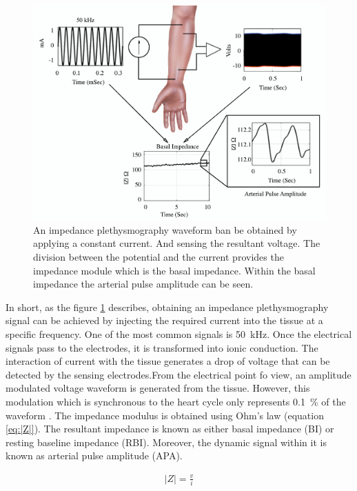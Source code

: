 \begin{figure}[!htpb]
	\centering
	\includegraphics[width=\textwidth,keepaspectratio]{figure15}    
	\caption[How to get an impedance plethysmography wavefor]{An impedance plethysmography waveform ban be obtained by applying a constant current. And sensing the resultant voltage. The division between the potential and the current provides the impedance module which is the basal impedance. Within the basal impedance the arterial pulse amplitude can be seen.}
	\label{fig:envelope iPG}
\end{figure}

In short, as the figure \ref{fig:envelope iPG} describes, obtaining an impedance plethysmography signal can be achieved by injecting the required current into the tissue at a specific frequency. One of the most common signals is \SI{50}{\kilo\hertz}. Once the electrical signals pass to the electrodes,  it is transformed into ionic conduction. The interaction of current with the tissue generates a drop of voltage that can be detected by the sensing electrodes.From the electrical point fo view, an amplitude modulated voltage waveform is generated from the tissue. However, this modulation which is synchronous to the heart cycle only represents \SI{0.1}{\percent} of the waveform \cite{anderson1984impedance}. 
The impedance modulus is obtained using Ohm's law (equation \ref{eq:|Z|}). The resultant impedance is known as either basal impedance (BI) or resting baseline impedance (RBI). Moreover, the dynamic signal within it is known as arterial pulse amplitude (APA). 
 
 
 \begin{align}
 	\label{eq:|Z|}
 	\left| Z \right| = \frac{v}{i}
 \end{align}

